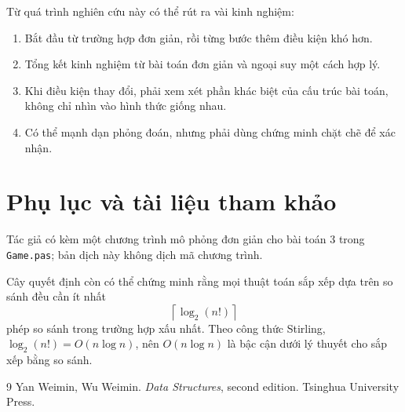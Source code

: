 \documentclass[11pt]{article}
\begin{document}
Từ quá trình nghiên cứu này có thể rút ra vài kinh nghiệm:

\begin{enumerate}
  \item Bắt đầu từ trường hợp đơn giản, rồi từng bước thêm điều kiện khó hơn.
  \item Tổng kết kinh nghiệm từ bài toán đơn giản và ngoại suy một cách hợp lý.
  \item Khi điều kiện thay đổi, phải xem xét phần khác biệt của cấu trúc bài
  toán, không chỉ nhìn vào hình thức giống nhau.
  \item Có thể mạnh dạn phỏng đoán, nhưng phải dùng chứng minh chặt chẽ để
  xác nhận.
\end{enumerate}

\section*{Phụ lục và tài liệu tham khảo}

Tác giả có kèm một chương trình mô phỏng đơn giản cho bài toán 3 trong
\texttt{Game.pas}; bản dịch này không dịch mã chương trình.

Cây quyết định còn có thể chứng minh rằng mọi thuật toán sắp xếp dựa trên so
sánh đều cần ít nhất
\[
  \left\lceil \log_2(n!) \right\rceil
\]
phép so sánh trong trường hợp xấu nhất. Theo công thức Stirling,
\(\log_2(n!)=O(n\log n)\), nên \(O(n\log n)\) là bậc cận dưới lý thuyết cho
sắp xếp bằng so sánh.

\begin{thebibliography}{9}
Yan Weimin, Wu Weimin.
\textit{Data Structures}, second edition.
Tsinghua University Press.
\end{thebibliography}
\end{document}
